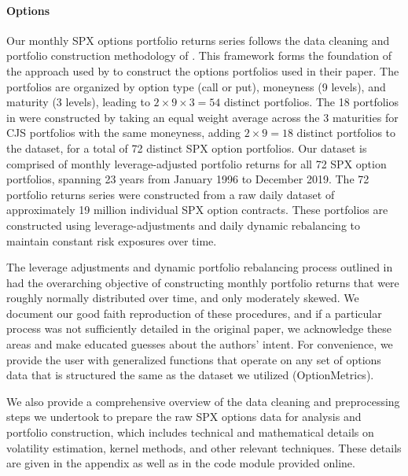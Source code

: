 \documentclass{article}
\begin{document}
\paragraph{Options}
Our monthly SPX options portfolio returns series follows the data cleaning and portfolio construction methodology of \citet{Constantinides2013}. This framework forms the foundation of the approach used by \citet{He2017} to construct the options portfolios used in their paper. The \citet{Constantinides2013} portfolios are organized by option type (call or put), moneyness (9 levels), and maturity (3 levels), leading to $2 \times 9 \times 3 = 54$ distinct portfolios. The 18 portfolios in \citet{He2017} were constructed by taking an equal weight average across the 3 maturities for CJS portfolios with the same moneyness, adding $2 \times 9 = 18$ distinct portfolios to the dataset, for a total of 72 distinct SPX option portfolios. Our dataset is comprised of monthly leverage-adjusted portfolio returns for all 72 SPX option portfolios, spanning 23 years from January 1996 to December 2019. The 72 portfolio returns series were constructed from a raw daily dataset of approximately 19 million individual SPX option contracts. These portfolios are constructed using leverage-adjustments and daily dynamic rebalancing to maintain constant risk exposures over time.


The leverage adjustments and dynamic portfolio rebalancing process outlined in \citet{Constantinides2013} had the overarching objective of constructing monthly portfolio returns that were roughly normally distributed over time, and only moderately skewed. We document our good faith reproduction of these procedures, and if a particular process was not sufficiently detailed in the original paper, we acknowledge these areas and make educated guesses about the authors' intent. For convenience, we provide the user with generalized functions that operate on any set of options data that is structured the same as the dataset we utilized (OptionMetrics).

We also provide a comprehensive overview of the data cleaning and preprocessing steps we undertook to prepare the raw SPX options data for analysis and portfolio construction, which includes technical and mathematical details on volatility estimation, kernel methods, and other relevant techniques. These details are given in the appendix as well as in the code module provided online.
\end{document}
